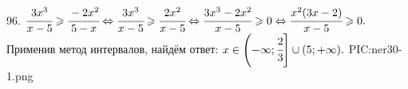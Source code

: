 96. $\cfrac{3x^3}{x-5}\geqslant\cfrac{-2x^2}{5-x}\Leftrightarrow\cfrac{3x^3}{x-5}\geqslant\cfrac{2x^2}{x-5}\Leftrightarrow
\cfrac{3x^3-2x^2}{x-5}\geqslant0\Leftrightarrow\cfrac{x^2(3x-2)}{x-5}\geqslant0.$ Применив метод интервалов, найдём ответ: $x\in\left(-\infty;\cfrac{2}{3}\right]
\cup(5;+\infty).$
{{PIC:ner30-1.png}}\\
